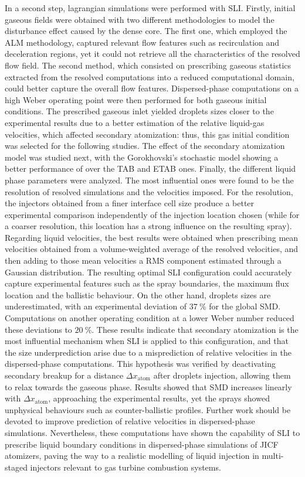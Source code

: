 In a second step, lagrangian simulations were performed with SLI. Firstly, initial gaseous fields were obtained with two different methodologies to model the disturbance effect caused by the dense core. The first one, which employed the ALM methodology, captured relevant flow features such as recirculation and deceleration regions, yet it could not retrieve all the characteristics of the resolved flow field. The second method, which consisted on prescribing gaseous statistics extracted from the resolved computations into a reduced computational domain, could better capture the overall flow features. Dispersed-phase computations on a high Weber operating point were then performed for both gaseous initial conditions. The prescribed gaseous inlet yielded droplets sizes closer to the experimental results due to a better estimation of the relative liquid-gas velocities, which affected secondary atomization: thus, this gas initial condition was selected for the following studies. The effect of the secondary atomization model was studied next, with the Gorokhovski's stochastic model showing a better performance of over the TAB and ETAB ones. Finally, the different liquid phase parameters were analyzed. The most influential ones were found to be the resolution of resolved simulations and the velocities imposed. For the resolution, the injectors obtained from a finer interface cell size produce a better experimental comparison independently of the injection location chosen (while for a coarser resolution, this location has a strong influence on the resulting spray). Regarding liquid velocities, the best results were obtained when prescribing mean velocities obtained from a volume-weighted average of the resolved velocities, and then adding to those mean velocities a RMS component estimated through a Gaussian distribution. The resulting optimal SLI configuration could accurately capture experimental features such as the spray boundaries, the maximum flux location and the ballistic behaviour. On the other hand, droplets sizes are underestimated, with an experimental deviation of $37~\%$ for the global SMD. Computations on another operating condition at a lower Weber number reduced these deviations to $20~\%$. These results indicate that secondary atomization is the most influential mechanism when SLI is applied to this configuration, and that the size underprediction arise due to a misprediction of relative velocities in the dispersed-phase computations. This hypothesis was verified by deactivating secondary breakup for a distance $\Delta x_\mathrm{atom}$ after droplets injection, allowing them to relax towards the gaseous phase. Results showed that SMD increases linearly with $\Delta x_\mathrm{atom}$, approaching the experimental results, yet the sprays showed unphysical behaviours such as counter-ballistic profiles. Further work should be devoted to improve prediction of relative velocities in dispersed-phase simulations. Nevertheless, these computations have shown the capability of SLI to prescribe liquid boundary conditions in dispersed-phase simulations of JICF atomizers, paving the way to a realistic modelling of liquid injection in multi-staged injectors relevant to gas turbine combustion systems.


